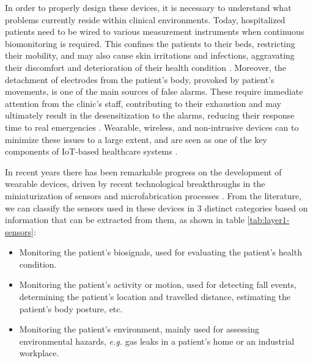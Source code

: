In order to properly design these devices, it is necessary to understand what problems currently reside within clinical environments. Today, hospitalized patients need to be wired to various measurement instruments when continuous biomonitoring is required. This confines the patients to their beds, restricting their mobility, and may also cause skin irritations and infections, aggravating their discomfort and deterioration of their health condition \cite{Darwish2011}. Moreover, the detachment of electrodes from the patient's body, provoked by patient's movements, is one of the main sources of false alarms. These require immediate attention from the clinic's staff, contributing to their exhaustion and may ultimately result in the desensitization to the alarms, reducing their response time to real emergencies \cite{DursunErgezen2020}. Wearable, wireless, and non-intrusive devices can to minimize these issues to a large extent, and are seen as one of the key components of \acs{IoT}-based healthcare systems \cite{Baker2017}.  \bigskip

In recent years there has been remarkable progress on the development of wearable devices, driven by recent technological breakthroughs in the miniaturization of sensors and microfabrication processes \cite{Adame2018}. From the literature, we can classify the sensors used in these devices in 3 distinct categories based on information that can be extracted from them, as shown in table \ref{tab:layer1-sensors}:

\begin{itemize}
    \item Monitoring the patient's biosignals, used for evaluating the patient's health condition.
    \item Monitoring the patient's activity or motion, used for detecting fall events, determining the patient's location and travelled distance, estimating the patient's body posture, etc.
    \item Monitoring the patient's environment, mainly used for assessing environmental hazards, \textit{e.g.} gas leaks in a patient's home or an industrial workplace.
\end{itemize}

